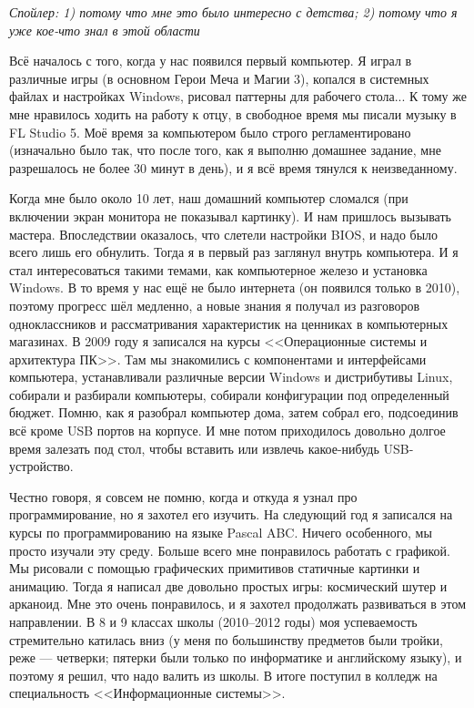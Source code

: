 \noindent\textit{Спойлер: 1) потому что мне это было интересно с детства; 2) потому что я уже кое-что знал в этой области}
		
		Всё началось с того, когда у нас появился первый компьютер. Я играл в различные игры (в основном Герои Меча и Магии 3), копался в системных файлах и настройках Windows, рисовал паттерны для рабочего стола... К тому же мне нравилось ходить на работу к отцу, в свободное время мы писали музыку в FL Studio 5. Моё время за компьютером было строго регламентировано (изначально было так, что после того, как я выполню домашнее задание, мне разрешалось не более 30 минут в день), и я всё время тянулся к неизведанному.
		
		Когда мне было около 10 лет, наш домашний компьютер сломался (при включении экран монитора не показывал картинку). И нам пришлось вызывать мастера. Впоследствии оказалось, что слетели настройки BIOS, и надо было всего лишь его обнулить. Тогда я в первый раз заглянул внутрь компьютера. И я стал интересоваться такими темами, как компьютерное железо и установка Windows. В то время у нас ещё не было интернета (он появился только в 2010), поэтому прогресс шёл медленно, а новые знания я получал из разговоров одноклассников и рассматривания характеристик на ценниках в компьютерных магазинах.
		В 2009 году я записался на курсы <<Операционные системы и архитектура ПК>>. Там мы знакомились с компонентами и интерфейсами компьютера, устанавливали различные версии Windows и дистрибутивы Linux, собирали и разбирали компьютеры, собирали конфигурации под определенный бюджет. Помню, как я разобрал компьютер дома, затем собрал его, подсоединив всё кроме USB портов на корпусе. И мне потом приходилось довольно долгое время залезать под стол, чтобы вставить или извлечь какое-нибудь USB-устройство.
		
		Честно говоря, я совсем не помню, когда и откуда я узнал про программирование, но я захотел его изучить. На следующий год я записался на курсы по программированию на языке Pascal ABC. Ничего особенного, мы просто изучали эту среду. Больше всего мне понравилось работать с графикой. Мы рисовали с помощью графических примитивов статичные картинки и анимацию. Тогда я написал две довольно простых игры: космический шутер и арканоид. Мне это очень понравилось, и я захотел продолжать развиваться в этом направлении.
		В 8 и 9 классах школы (2010--2012 годы) моя успеваемость стремительно катилась вниз (у меня по большинству предметов были тройки, реже --- четверки; пятерки были только по информатике и английскому языку), и поэтому я решил, что надо валить из школы. В итоге поступил в колледж на специальность <<Информационные системы>>.
		

